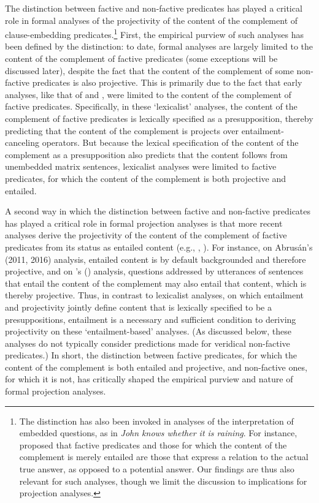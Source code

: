 \documentclass[11pt,fleqn]{article}
\newcommand{\6}{\mbox{$[\hspace*{-.6mm}[$}}
\newcommand{\9}{\mbox{$]\hspace*{-.6mm}]$}}
\newcommand{\citetpos}[1]{\citeauthor{#1}'s (\citeyear{#1})}
\begin{document}
The distinction between factive and non-factive predicates has played a critical role in formal analyses of the projectivity of the content of the complement of clause-embedding predicates.\footnote{The distinction has also been invoked in analyses of the interpretation of embedded questions, as in {\em John knows whether it is raining}. For instance, \citet{spector-egre2015} proposed that factive predicates and those for which the content of the complement is merely entailed are those that express a relation to the actual true answer, as opposed to a potential answer. Our findings are thus also relevant for such analyses, though we limit the discussion to implications for projection analyses.} First, the empirical purview of such analyses has been defined by the distinction: to date, formal analyses are largely limited to the content of the complement of factive predicates (some exceptions will be discussed later), despite the fact that the content of the complement of some non-factive predicates is also projective. This is primarily due to the fact that early analyses, like that of \citealt{heim83} and \citealt{vds92}, were limited to the content of the complement of factive predicates. Specifically, in these `lexicalist' analyses, the content of the complement of factive predicates is lexically specified as a presupposition, thereby predicting that the content of the complement is projects over entailment-canceling operators. But because the lexical specification of the content of the complement as a presupposition also predicts that the content follows from unembedded matrix sentences, lexicalist analyses were limited to factive predicates, for which the content of the complement is both projective and entailed. 

A second way in which the distinction between factive and non-factive predicates has played a critical role in formal projection analyses is that more recent analyses derive the projectivity of the content of the complement of factive predicates from its status as entailed content (e.g., \citealt{abrusan2011,abrusan2016}, \citealt{romoli2015,best-question}). For instance, on Abrus\'an's (2011, 2016) analysis, entailed content is by default backgrounded and therefore projective, and on \citetpos{best-question} analysis, questions addressed by utterances of sentences that entail the content of the complement may also entail that content, which is thereby projective. Thus, in contrast to lexicalist analyses, on which entailment and projectivity jointly define content that is lexically specified to be a presuppositions, entailment is a necessary and sufficient condition to deriving projectivity on these `entailment-based' analyses. (As discussed below, these analyses do not typically consider predictions made for veridical non-factive predicates.) In short, the distinction between factive predicates, for which the content of the complement is both entailed and projective, and non-factive ones, for which it is not, has critically shaped the empirical purview and nature of  formal projection analyses. 
\end{document}
